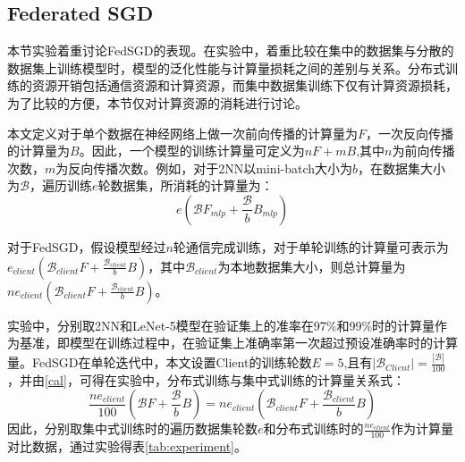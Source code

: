 \documentclass[zihao = -4,cn]{oucart}
\begin{document}
\subsection{Federated SGD}
本节实验着重讨论FedSGD的表现。在实验中，着重比较在集中的数据集与分散的数据集上训练模型时，模型的泛化性能与计算量损耗之间的差别与关系。分布式训练的资源开销包括通信资源和计算资源，而集中数据集训练下仅有计算资源损耗，为了比较的方便，本节仅对计算资源的消耗进行讨论。\par
本文定义对于单个数据在神经网络上做一次前向传播的计算量为$F$，一次反向传播的计算量为$B$。因此，一个模型的训练计算量可定义为$nF+mB$,其中$n$为前向传播次数，$m$为反向传播次数。例如，对于2NN以mini-batch大小为$b$，在数据集大小为$\mathcal{B}$，遍历训练$e$轮数据集，所消耗的计算量为：
\begin{equation}
\label{cal}
e(\mathcal{B}F_{mlp}+\frac{\mathcal{B}}{b}B_{mlp})
\end{equation}
\par
对于FedSGD，假设模型经过$n$轮通信完成训练，对于单轮训练的计算量可表示为$e_{client}(\mathcal{B}_{client}F+\frac{\mathcal{B}_{client}}{b}B)$，其中$\mathcal{B}_{client}$为本地数据集大小，则总计算量为$ne_{client}(\mathcal{B}_{client}F+\frac{\mathcal{B}_{client}}{b}B)$。\par
实验中，分别取2NN和LeNet-5模型在验证集上的准率在97\%和99\%时的计算量作为基准，即模型在训练过程中，在验证集上准确率第一次超过预设准确率时的计算量。FedSGD在单轮迭代中，本文设置Client的训练轮数$E=5$,且有$|\mathcal{B}_{Client}|=\frac{|\mathcal{B}|}{100}$，并由\ref{cal}，可得在实验中，分布式训练与集中式训练的计算量关系式：
\begin{equation}
\frac{ne_{client}}{100}(\mathcal{B}F+\frac{\mathcal{B}}{b}B) = ne_{client}(\mathcal{B}_{client}F+\frac{\mathcal{B}_{client}}{b}B)
\end{equation}
因此，分别取集中式训练时的遍历数据集轮数$e$和分布式训练时的$\frac{ne_{client}}{100}$作为计算量对比数据，通过实验得表\ref{tab:experiment}。\par
\end{document}
